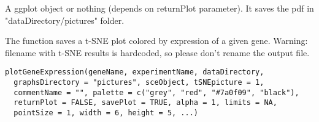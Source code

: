 \documentclass[a4paper]{book}
\begin{document}
%
\begin{Value}
A ggplot object or nothing (depends on returnPlot parameter). It saves the pdf in "dataDirectory/pictures" folder.
\end{Value}
%
\begin{Description}\relax
The function saves a t-SNE plot colored by expression of a given gene. 
Warning: filename with t-SNE results is hardcoded, so please don't rename the output file.
\end{Description}
%
\begin{Usage}
\begin{verbatim}
plotGeneExpression(geneName, experimentName, dataDirectory,
  graphsDirectory = "pictures", sceObject, tSNEpicture = 1,
  commentName = "", palette = c("grey", "red", "#7a0f09", "black"),
  returnPlot = FALSE, savePlot = TRUE, alpha = 1, limits = NA,
  pointSize = 1, width = 6, height = 5, ...)
\end{verbatim}
\end{Usage}
%
\end{document}
